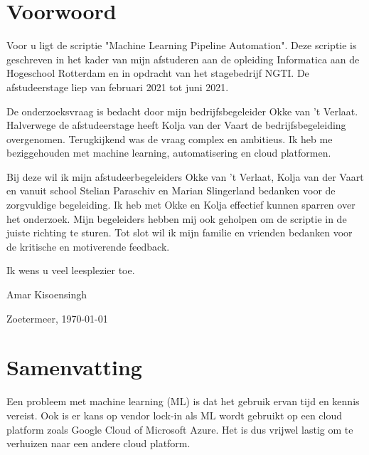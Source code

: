 \titleformat{\chapter}{\vspace{-1in}}{}{}{\Huge\textbf}
\section*{Voorwoord}\thispagestyle{fancy}
Voor u ligt de scriptie "Machine Learning Pipeline Automation". Deze scriptie is geschreven in het kader van mijn afstuderen aan de opleiding Informatica aan de Hogeschool Rotterdam en in opdracht van het stagebedrijf NGTI. De afstudeerstage liep van februari 2021 tot juni 2021.

De onderzoeksvraag is bedacht door mijn bedrijfsbegeleider Okke van 't Verlaat. Halverwege de afstudeerstage heeft Kolja van der Vaart de bedrijfsbegeleiding overgenomen. Terugkijkend was de vraag complex en ambitieus. Ik heb me beziggehouden met machine learning, automatisering en cloud platformen. 

Bij deze wil ik mijn afstudeerbegeleiders Okke van 't Verlaat, Kolja van der Vaart en vanuit school Stelian Paraschiv en Marian Slingerland bedanken voor de zorgvuldige begeleiding. Ik heb met Okke en Kolja effectief kunnen sparren over het onderzoek. Mijn begeleiders hebben mij ook geholpen om de scriptie in de juiste richting te sturen. Tot slot wil ik mijn familie en vrienden bedanken voor de kritische en motiverende feedback.

Ik wens u veel leesplezier toe.

Amar Kisoensingh

Zoetermeer, \today

\newpage

\section*{Samenvatting}
Een probleem met machine learning (ML) is dat het gebruik ervan tijd en kennis vereist. Ook is er kans op vendor lock-in als ML wordt gebruikt op een cloud platform zoals Google Cloud of Microsoft Azure. Het is dus vrijwel lastig om te verhuizen naar een andere cloud platform.

